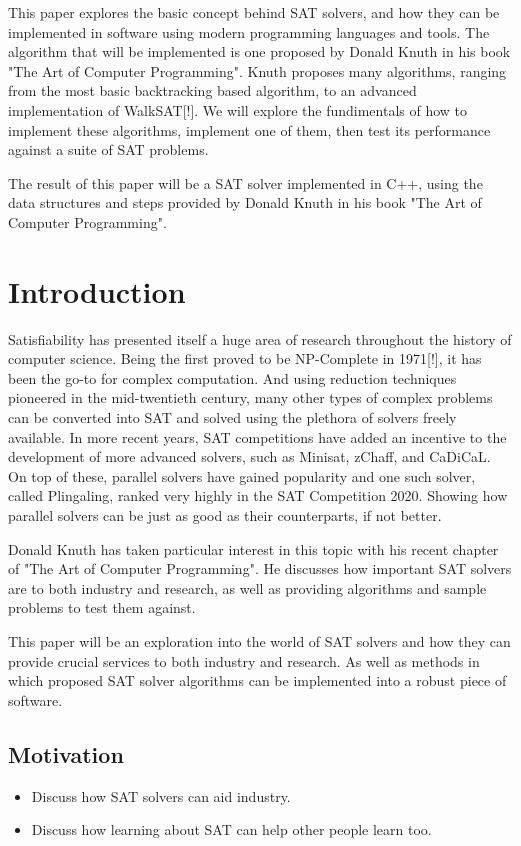 \documentclass{article}
\begin{document}
This paper explores the basic concept behind SAT solvers, and how they can be implemented in
software using modern programming languages and tools. The algorithm that will be
implemented is one proposed by Donald Knuth in his book "The Art of Computer Programming". Knuth proposes
many algorithms, ranging from the most basic backtracking based algorithm, to an advanced
implementation of WalkSAT[!]. We will explore the fundimentals of how to implement these algorithms,
implement one of them, then test its performance against a suite of SAT problems.

The result of this paper will be a SAT solver implemented in C++, using the data structures and
steps provided by Donald Knuth in his book "The Art of Computer Programming".

\newpage
\tableofcontents

\newpage
\section{Introduction}
Satisfiability has presented itself a huge area of research throughout the history of computer
science. Being the first proved to be NP-Complete in 1971[!], it has been the go-to for complex
computation. And using reduction techniques pioneered in the mid-twentieth century, many other types
of complex problems can be converted into SAT and solved using the plethora of solvers freely
available. In more recent years, SAT competitions have added an incentive to the development of more
advanced solvers, such as Minisat, zChaff, and CaDiCaL. On top of these, parallel solvers have
gained popularity and one such solver, called Plingaling, ranked very highly in the SAT Competition
2020. Showing how parallel solvers can be just as good as their counterparts, if not better.

Donald Knuth has taken particular interest in this topic with his recent chapter of "The Art of Computer Programming". He discusses how important SAT solvers are to both industry and research, as well as providing algorithms and sample problems to test them against.

This paper will be an exploration into the world of SAT solvers and how they can provide crucial services to both industry and research. As well as methods in which proposed SAT solver algorithms can be implemented into a robust piece of software.

\subsection{Motivation}
\begin{itemize}
    \item Discuss how SAT solvers can aid industry.
    \item Discuss how learning about SAT can help other people learn too.
\end{itemize}
\end{document}
